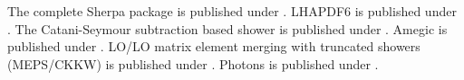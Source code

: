 \documentclass{article}
\begin{document}
The complete Sherpa package is published under \cite{Gleisberg:2008ta}.
LHAPDF6 is published under \cite{Buckley:2014ana}.
The Catani-Seymour subtraction based shower is published under \cite{Schumann:2007mg}.
Amegic is published under \cite{Krauss:2001iv}.
LO/LO matrix element merging with truncated showers (MEPS/CKKW) is published under \cite{Hoeche:2009rj}.
Photons is published under \cite{Schonherr:2008av}.
\end{document}
